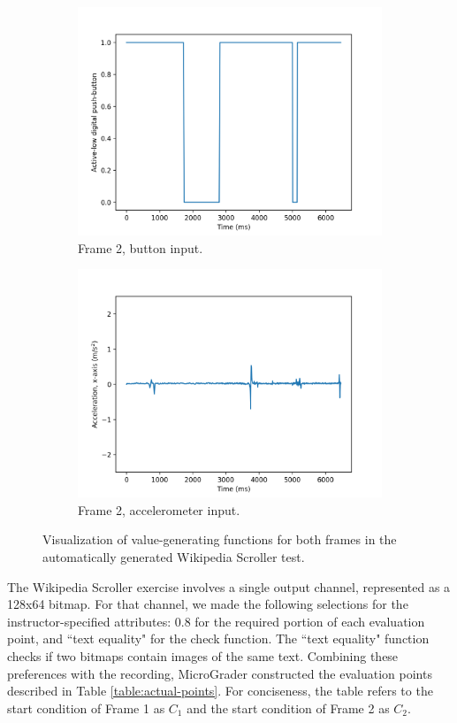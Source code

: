 \documentclass[12pt]{article}
\begin{document}
\begin{figure}[ht]
\begin{subfigure}[b]{.45\linewidth}
\includegraphics[width=\linewidth]{f1-button.png}
\caption{Frame 2, button input.}
\end{subfigure}
\begin{subfigure}[b]{.45\linewidth}
\includegraphics[width=\linewidth]{f1-acc.png}
\caption{Frame 2, accelerometer input.}
\end{subfigure}

\caption{Visualization of value-generating functions for both frames in the automatically generated Wikipedia Scroller test.}
\label{fig:actual-input-frames}
\end{figure}

The Wikipedia Scroller exercise involves a single output channel, represented as a 128x64 bitmap.  For that channel, we made the following selections for the instructor-specified attributes: 0.8 for the required portion of each evaluation point, and ``text equality" for the check function.  The ``text equality" function checks if two bitmaps contain images of the same text.   Combining these preferences with the recording, MicroGrader constructed the evaluation points described in Table \ref{table:actual-points}.  For conciseness, the table refers to the start condition of Frame 1 as $C_1$ and the start condition of Frame 2 as $C_2$.
\end{document}
